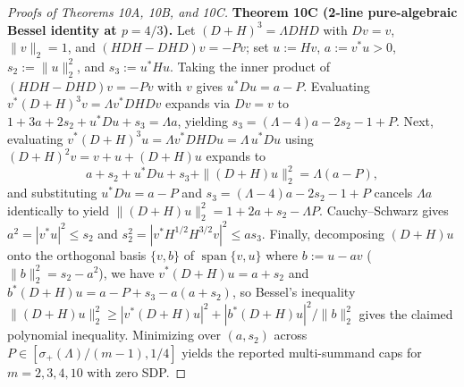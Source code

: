 \documentclass[10pt,letterpaper]{article}
\begin{document}
\begin{proof}[Proofs of Theorems 10A, 10B, and 10C]
\textbf{Theorem 10C (2-line pure-algebraic Bessel identity at $p = 4/3$).}
Let $(D+H)^3 = \Lambda D H D$ with $Dv = v$, $\|v\|_2 = 1$, and $(HDH - DHD)v = -Pv$; set $u := Hv$, $a := v^* u > 0$, $s_2 := \|u\|_2^2$, and $s_3 := u^* H u$. Taking the inner product of $(HDH - DHD)v = -Pv$ with $v$ gives $u^* D u = a - P$. Evaluating $v^*(D+H)^3 v = \Lambda v^* D H D v$ expands via $Dv = v$ to $1 + 3a + 2s_2 + u^* D u + s_3 = \Lambda a$, yielding $s_3 = (\Lambda - 4)a - 2s_2 - 1 + P$. Next, evaluating $v^*(D+H)^3 u = \Lambda v^* D H D u = \Lambda\, u^* D u$ using $(D+H)^2 v = v + u + (D+H)u$ expands to
\[
  a + s_2 + u^* D u + s_3 + \|(D+H)u\|_2^2 = \Lambda(a - P),
\]
and substituting $u^* D u = a - P$ and $s_3 = (\Lambda - 4)a - 2s_2 - 1 + P$ cancels $\Lambda a$ identically to yield $\|(D+H)u\|_2^2 = 1 + 2a + s_2 - \Lambda P$. Cauchy--Schwarz gives $a^2 = |v^* u|^2 \le s_2$ and $s_2^2 = |v^* H^{1/2} H^{3/2} v|^2 \le a s_3$. Finally, decomposing $(D+H)u$ onto the orthogonal basis $\{v, b\}$ of $\operatorname{span}\{v, u\}$ where $b := u - av$ ($\|b\|_2^2 = s_2 - a^2$), we have $v^*(D+H)u = a + s_2$ and $b^*(D+H)u = a - P + s_3 - a(a + s_2)$, so Bessel's inequality $\|(D+H)u\|_2^2 \ge |v^*(D+H)u|^2 + |b^*(D+H)u|^2 / \|b\|_2^2$ gives the claimed polynomial inequality. Minimizing over $(a, s_2)$ across $P \in [\sigma_+(\Lambda)/(m-1), 1/4]$ yields the reported multi-summand caps for $m = 2, 3, 4, 10$ with zero SDP.
\end{proof}
\end{document}
